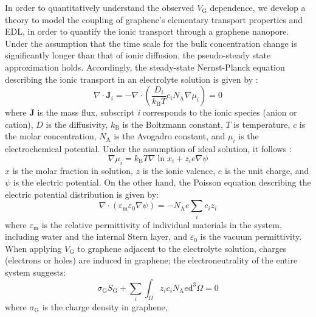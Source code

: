 \documentclass[journal=nalefd,email=true, hyperref=true, keywords=false]{achemso}
\begin{document}
In order to quantitatively understand the observed $V_{\mathrm{G}}$
dependence, we develop a theory to model the coupling of graphene's
elementary transport properties and EDL, in order to quantify the
ionic transport through a graphene nanopore. Under the assumption that
the time scale for the bulk concentration change is significantly
longer than that of ionic diffusion, the pseudo-steady state
approximation holds. Accordingly, the steady-state Nernst-Planck
equation describing the ionic transport in an electrolyte solution is
given by \cite{MacGillivray_1968}:
\begin{equation}
  \label{eq:pnp}
  \nabla \cdot \boldsymbol{J}_{i} = -\nabla \cdot (\frac{D_{i}}{k_{\mathrm{B}}T} c_{i} N_{\mathrm{A}} \nabla \mu_{i}) = 0
\end{equation}
where $\boldsymbol{J}$ is the mass flux, subscript \textit{i}
corresponds to the ionic species (anion or cation), $D$ is the diffusivity,
$k_{\mathrm{B}}$ is the Boltzmann constant, $T$ is temperature, $c$ is
the molar concentration, $N_{\mathrm{A}}$ is the Avogadro constant,
and $\mu_{i}$ is the electrochemical potential. Under the assumption
of ideal solution, it follows \cite{Kilic_2007}:
\begin{equation}
  \label{eq:mu}
  \nabla \mu_{i} = k_{\mathrm{B}} T \nabla \ln x_{i} + z_{i} e \nabla \psi
\end{equation}
 $x$ is the molar fraction in solution, $z$ is the ionic valence,
$e$ is the unit charge, and $\psi$ is the electric potential. On the
other hand, the Poisson equation describing the electric potential
distribution is given by:
\begin{equation}
  \label{eq:poisson}
  \nabla \cdot (\varepsilon_{\mathrm{m}} \varepsilon_{0} \nabla \psi)
  =
  - N_{\mathrm{A}} e \sum_{i} c_{i} z_{i}
\end{equation}
where $\varepsilon_{\mathrm{m}}$ is the relative permittivity of
individual materials in the system, including water and the internal
Stern layer\cite{Tian_2017}, and
$\varepsilon_{0}$ is the vacuum permittivity. When applying
$V_{\mathrm{G}}$ to graphene adjacent to the electrolyte solution,
charges (electrons or holes) are induced in graphene; the
electroneutrality of the entire system suggests:
\begin{equation}
  \label{eq:electro-neutral}
  \sigma_{\mathrm{G}} S_{\mathrm{G}} + \sum_{i} \int_{\Omega} z_{i} c_{i} N_{\mathrm{A}} e \mathrm{d}^{3} \Omega= 0
\end{equation}
where $\sigma_{\mathrm{G}}$ is the charge density in graphene,
\end{document}
